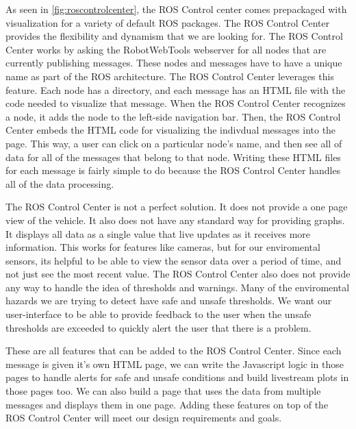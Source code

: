 As seen in \ref{fig:roscontrolcenter}, the ROS Control center comes prepackaged with visualization for a variety of default ROS packages.  The ROS Control Center provides the flexibility and dynamism that we are looking for.  The ROS Control Center works by asking the RobotWebTools webserver for all nodes that are currently publishing messages.  These nodes and messages have to have a unique name as part of the ROS architecture.  The ROS Control Center leverages this feature.  Each node has a directory, and each message has an HTML file with the code needed to visualize that message.  When the ROS Control Center recognizes a node, it adds the node to the left-side navigation bar.  Then, the ROS Control Center embeds the HTML code for visualizing the indivdual messages into the page.  This way, a user can click on a particular node's name, and then see all of data for all of the messages that belong to that node.  Writing these HTML files for each message is fairly simple to do because the ROS Control Center handles all of the data processing.

The ROS Control Center is not a perfect solution.  It does not provide a one page view of the vehicle.  It also does not have any standard way for providing graphs.  It displays all data as a single value that live updates as it receives more information.  This works for features like cameras, but for our enviromental sensors, its helpful to be able to view the sensor data over a period of time, and not just see the most recent value.  The ROS Control Center also does not provide any way to handle the idea of thresholds and warnings. Many of the enviromental hazards we are trying to detect have safe and unsafe thresholds.  We want our user-interface to be able to provide feedback to the user when the unsafe thresholds are exceeded to quickly alert the user that there is a problem.

These are all features that can be added to the ROS Control Center.  Since each message is given it's own HTML page, we can write the Javascript logic in those pages to handle alerts for safe and unsafe conditions and build livestream plots in those pages too.  We can also build a page that uses the data from multiple messages and displays them in one page.  Adding these features on top of the ROS Control Center will meet our design requirements and goals.

